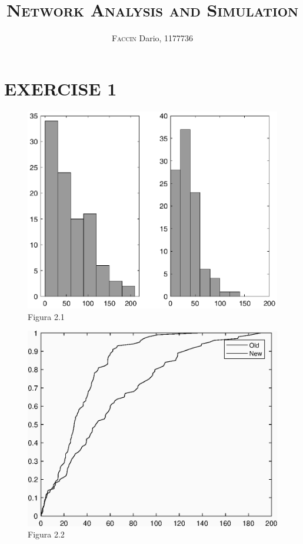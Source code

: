 \documentclass[a4paper, 12pt]{article}
\begin{document}
\author{\textsc{Faccin} Dario, 1177736}
\title{\vspace{-2cm} \textsc{Network Analysis and Simulation}}
\vspace{-8ex}
\date{}
\maketitle


\section*{EXERCISE 1}

\begin{figure}[h!]
	\centering
	\includegraphics{fig21}
	\caption*{Figura 2.1}
\end{figure} 

\begin{figure}[h!]
	\centering
	\includegraphics{fig22}
	\caption*{Figura 2.2}
\end{figure} 
\end{document}
